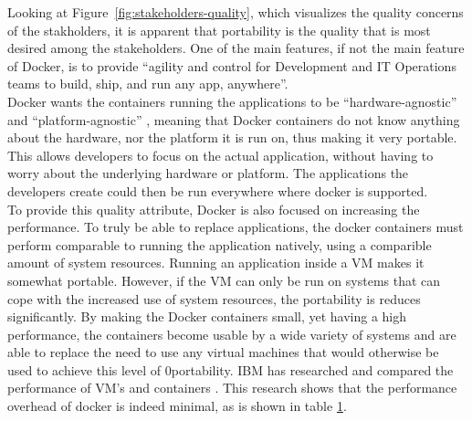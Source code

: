 Looking at Figure~\ref{fig:stakeholders-quality}, which visualizes the quality concerns of the stakholders, it is apparent that portability is the quality that is most desired among the stakeholders. One of the main features, if not the main feature of Docker, is to provide ``agility and control for Development and IT Operations teams to build, ship, and run any app, anywhere''\cite{dockermain}.\\
Docker wants the containers running the applications to be ``hardware-agnostic'' and ``platform-agnostic'' \cite{dockerrepo}, meaning that Docker containers do not know anything about the hardware, nor the platform it is run on, thus making it very portable. This allows developers to focus on the actual application, without having to worry about the underlying hardware or platform. The applications the developers create could then be run everywhere where docker is supported.\\
To provide this quality attribute, Docker is also focused on increasing the performance. To truly be able to replace applications, the docker containers must perform comparable to running the application natively, using a comparible amount of system resources. Running an application inside a VM makes it somewhat portable. However, if the VM can only be run on systems that can cope with the increased use of system resources, the portability is reduces significantly. By making the Docker containers small, yet having a high performance, the containers become usable by a wide variety of systems and are able to replace the need to use any virtual machines that would otherwise be used to achieve this level of 0portability\cite{dockerrepo}. IBM has researched and compared the performance of VM's and containers \cite{IBM-performance}. This research shows that the performance overhead of docker is indeed minimal, as is shown in table \ref{fig:ibm-dockerperforrmance}.

\begin{figure}[H]
\centering
\begin{center}
\end{center}
%
\label{fig:ibm-dockerperforrmance}
\end{figure}

